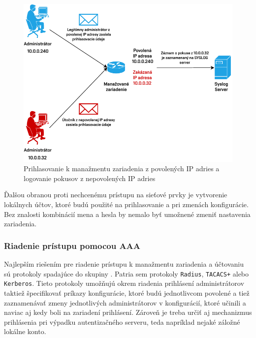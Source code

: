 \begin{figure}[H]
	\begin{center}
		\includegraphics[scale=1]{obrazky/login-log.pdf}
	\end{center}
	\caption[Prihlasovanie k manažmentu zariadenia z povolených IP adries a logovanie pokusov z nepovolených IP adries]{Prihlasovanie k manažmentu zariadenia z povolených IP adries a logovanie pokusov z nepovolených IP adries}
	\label{fig:login-log-mngmt}
\end{figure} 

\newpage
Ďalšou obranou proti nechcenému prístupu na sieťové prvky je vytvorenie lokálnych účtov, ktoré budú použité na prihlasovanie a pri zmenách konfigurácie. Bez znalosti kombinácií mena a hesla by nemalo byť umožnené zmeniť nastavenia zariadenia.  

\subsubsection*{Riadenie prístupu pomocou AAA}
Najlepším riešením pre riadenie prístupu k manažmentu zariadenia a účtovaniu sú protokoly spadajúce do skupiny . Patria sem protokoly \texttt{Radius}, \texttt{TACACS+} alebo \texttt{Kerberos}. Tieto protokoly umožňujú okrem riadenia prihlásení administrátorov taktiež špecifikovať príkazy konfigurácie, ktoré budú jednotlivcom povolené a tiež zaznamenávať zmeny jednotlivých administrátorov v konfigurácií, ktoré učinili a naviac aj kedy boli na zariadení prihlásení. Zároveň je treba určiť aj mechanizmus prihlásenia pri výpadku autentizačného serveru, teda napríklad nejaké záložné lokálne konto.

